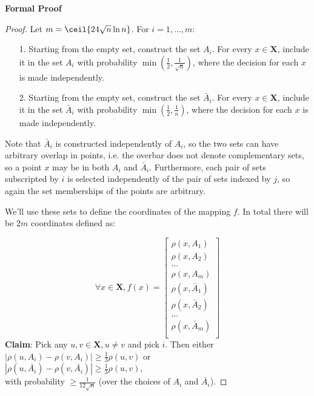 \textbf{Formal Proof}
\begin{proof}
  Let $m=\ceil{24 \sqrt{n} \ln n}$. For $i=1, ..., m$:
  \begin{enumerate}
  \item[1.] Starting from the empty set, construct the set $A_i$.
  For every 
  $x \in \mathbf{X}$, include it in the set $A_i$ with probability
    $\min (\frac{1}{2}, \frac{1}{\sqrt{n}})$, where the 
    decision for each $x$ is made independently.
  \item[2.] Starting from the empty set,
  construct the set $\bar{A}_i$. 
  For every 
  $x \in \mathbf{X}$, include it in the set $\bar{A}_i$ 
  with probability
    $\min (\frac{1}{2}, \frac{1}{n})$, where the 
    decision for each $x$ is made independently.\\  
  \end{enumerate}
Note that $\bar{A}_i$ is constructed independently of $A_i$, so 
    the two sets can have arbitrary overlap in points, i.e. 
    the overbar does not denote
    complementary sets, so a point $x$ may be in both 
    $A_i$ and $\bar{A}_i$. Furthermore, each pair of sets
    subscripted by $i$ is selected independently of the pair
    of sets indexed by $j$, so again the set memberships
    of the points are arbitrary.
    
We'll use these sets to define the coordinates of the 
mapping $f$. In total there will be $2m$ coordinates defined as:

\[
\forall x \in \mathbf{X}, f(x)=
\begin{bmatrix}
    \rho (x,A_1)\\
    \rho (x,A_2)\\
    ...\\
    \rho (x,A_m)\\
    \rho (x,\bar{A}_1)\\
    \rho (x,\bar{A}_2)\\
    ...\\
    \rho (x,\bar{A}_m)\\
\end{bmatrix}
\]
\textbf{Claim}: Pick any $u,v \in \mathbf{X},u\neq v$ and pick $i$.
Then either \\
$|\rho (u,A_i)-\rho (v,A_i)| \geq \frac{1}{3} \rho (u,v)$ or \\
$|\rho (u,\bar{A_i})-\rho (v,\bar{A_i})|\geq \frac{1}{3} \rho (u,v)$,\\
with
probability $\geq \frac{1}{12\sqrt{n}}$ (over the choices of $A_i$ and
$\bar{A_i}$). 


\end{proof}
